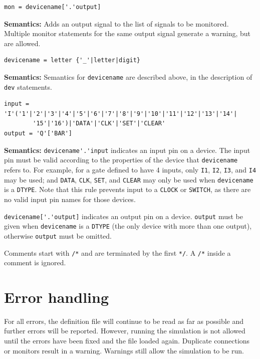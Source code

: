 \documentclass[a4paper,10pt]{article}
\begin{document}
\begin{verbatim}
mon = devicename['.'output]
\end{verbatim} 
\textbf{Semantics:} Adds an output signal to the list of signals to be monitored. Multiple monitor statements for the same output signal generate a warning, but are allowed.

\begin{verbatim}
devicename = letter {'_'|letter|digit}
\end{verbatim}
\textbf{Semantics:} Semantics for \texttt{devicename} are described above, in the description of \texttt{dev} statements.

\begin{verbatim}
input = 'I'('1'|'2'|'3'|'4'|'5'|'6'|'7'|'8'|'9'|'10'|'11'|'12'|'13'|'14'|
        '15'|'16')|'DATA'|'CLK'|'SET'|'CLEAR'
output = 'Q'['BAR']
\end{verbatim} 

\textbf{Semantics:} \verb|devicename'.'input| indicates an input pin on a device. The input pin must be valid according to the properties of the device that \texttt{devicename} refers to. For example, for a gate defined to have 4 inputs, only \texttt{I1}, \texttt{I2}, \texttt{I3}, and \texttt{I4} may be used; and \texttt{DATA}, \texttt{CLK}, \texttt{SET}, and \texttt{CLEAR} may only be used when \texttt{devicename} is a \texttt{DTYPE}.
Note that this rule prevents input to a \texttt{CLOCK} or \texttt{SWITCH}, as there are no valid input pin names for those devices.

\verb|devicename['.'output]| indicates an output pin on a device. \texttt{output} must be given when \texttt{devicename} is a \texttt{DTYPE} (the only device with more than one output), otherwise \texttt{output} must be omitted. 

Comments start with \texttt{/*} and are terminated by the first \texttt{*/}. A \texttt{/*} inside a comment is ignored. 

\section{Error handling}
\label{sec:error-handling}

For all errors, the definition file will continue to be read as far as possible and further errors will be reported. However, running the simulation is not allowed until the errors have been fixed and the file loaded again. Duplicate connections or monitors result in a warning. Warnings still allow the simulation to be run. 
\end{document}

